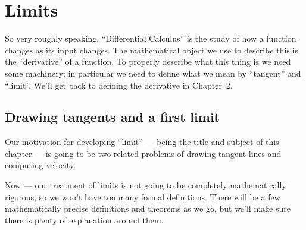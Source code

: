 %
%
\graphicspath{{./figures/limits/}}


\chapter{Limits}\label{chap limits}

So very roughly speaking, ``Differential Calculus'' is the study of how a
function changes as its input changes. The mathematical object we use to
describe this is the ``derivative'' of a function. To properly describe what
this thing is we need some machinery; in particular we need to define what we
mean by ``tangent'' and ``limit''. We'll get back to defining the derivative in
Chapter~2.

\section{Drawing tangents and a first limit}\label{sec first lim}
Our motivation for developing ``limit'' --- being the title and subject of this
chapter --- is going to be two related problems of drawing tangent lines and
computing velocity.

Now --- our treatment of limits is not going to be completely mathematically
rigorous, so we won't have too many formal definitions. There will be a few
mathematically precise definitions and theorems as we go, but we'll make sure
there is plenty of explanation around them.

